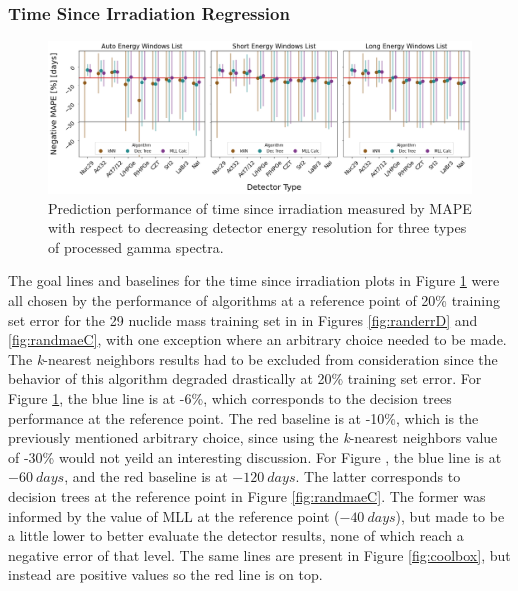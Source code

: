 \subsubsection{Time Since Irradiation Regression}

\begin{figure}[!htb]
  \centering
  \includegraphics[width=\textwidth]{./chapters/exp2/detector_preds_wrt_enlist_MAPE_cool.png}
  \caption{Prediction performance of time since irradiation measured by 
           \gls{MAPE} with respect to decreasing detector energy resolution 
           for three types of processed gamma spectra.}
  \label{fig:cool}
\end{figure}

The goal lines and baselines for the time since irradiation plots in Figure
\ref{fig:cool} were all chosen by the performance of algorithms at a reference
point of 20\% training set error for the 29 nuclide mass training set in in
Figures \ref{fig:randerrD} and \ref{fig:randmaeC}, with one exception where an
arbitrary choice needed to be made.  The \textit{k}-nearest neighbors results
had to be excluded from consideration since the behavior of this algorithm
degraded drastically at 20\% training set error.  For Figure \ref{fig:cool},
the blue line is at -6\%, which corresponds to the decision trees performance
at the reference point.  The red baseline is at -10\%, which is the previously
mentioned arbitrary choice, since using the \textit{k}-nearest neighbors value
of -30\% would not yeild an interesting discussion.  For Figure
, the blue line is at $-60\:days$, and the red baseline is at
$-120\:days$.  The latter corresponds to decision trees at the reference point
in Figure \ref{fig:randmaeC}. The former was informed by the value of \gls{MLL}
at the reference point ($-40\:days$), but made to be a little lower to better
evaluate the detector results, none of which reach a negative error of that
level.  The same lines are present in Figure \ref{fig:coolbox}, but instead are
positive values so the red line is on top.

